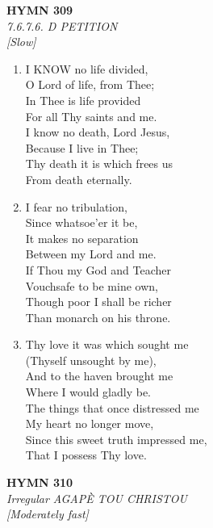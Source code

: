 \documentclass[11pt,a4paper]{article}
\begin{document}
\newpage
\begin{center}
    {\Large \textbf{HYMN 309}}
    \\
    \textit{7.6.7.6. D PETITION}
    \\
    \textit{\small [Slow]}
\end{center}
\vspace{1em}

\begin{enumerate}
    \item I KNOW no life divided, \\
        O Lord of life, from Thee; \\
        In Thee is life provided \\
        For all Thy saints and me. \\
        I know no death, Lord Jesus, \\
        Because I live in Thee; \\
        Thy death it is which frees us \\
        From death eternally.

    \item I fear no tribulation, \\
        Since whatsoe'er it be, \\
        It makes no separation \\
        Between my Lord and me. \\
        If Thou my God and Teacher \\
        Vouchsafe to be mine own, \\
        Though poor I shall be richer \\
        Than monarch on his throne.

    \item Thy love it was which sought me \\
        (Thyself unsought by me), \\
        And to the haven brought me \\
        Where I would gladly be. \\
        The things that once distressed me \\
        My heart no longer move, \\
        Since this sweet truth impressed me, \\
        That I possess Thy love.

\end{enumerate}

\newpage
\begin{center}
    {\Large \textbf{HYMN 310}}
    \\
    \textit{Irregular AGAP\`E TOU CHRISTOU}
    \\
    \textit{\small [Moderately fast]}
\end{center}
\vspace{1em}
\end{document}
